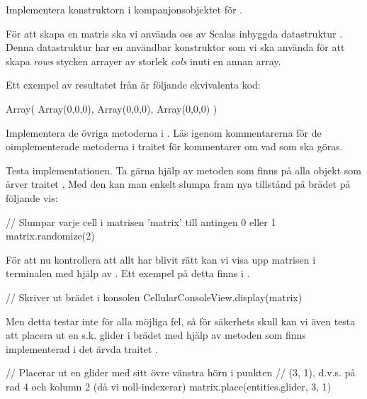 \Subtask Implementera konstruktorn i kompanjonsobjektet för .

För att skapa en matris ska vi använda oss av Scalas inbyggda datastruktur . Denna datastruktur har en användbar konstruktor  som vi ska använda för att skapa \emph{rows} stycken arrayer av storlek \emph{cols} inuti en annan array.

Ett exempel av resultatet från  är följande ekvivalenta kod:

\begin{Code}
Array(
	Array(0,0,0),
	Array(0,0,0),
	Array(0,0,0)
)
\end{Code}



\Subtask Implementera de övriga metoderna i . Läs igenom kommentarerna för de oimplementerade metoderna i traitet  för kommentarer om vad som ska göras.


\Subtask Testa implementationen. Ta gärna hjälp av metoden  som finns på alla objekt som ärver traitet . Med den kan man enkelt slumpa fram nya tillstånd på brädet på följande vis:

\begin{Code}
// Slumpar varje cell i matrisen 'matrix' till antingen 0 eller 1
matrix.randomize(2)
\end{Code}

För att nu kontrollera att allt har blivit rätt kan vi visa upp matrisen i terminalen med hjälp av . Ett exempel på detta finns i .

\begin{Code}
// Skriver ut brädet i konsolen
CellularConsoleView.display(matrix)
\end{Code}

Men detta testar inte för alla möjliga fel, så för säkerhets skull kan vi även testa att placera ut en s.k. glider i brädet med hjälp av metoden  som finns implementerad i det ärvda traitet .

\begin{Code}
// Placerar ut en glider med sitt övre vänstra hörn i punkten
// (3, 1), d.v.s. på rad 4 och kolumn 2 (då vi noll-indexerar)
matrix.place(entities.glider, 3, 1)
\end{Code}

